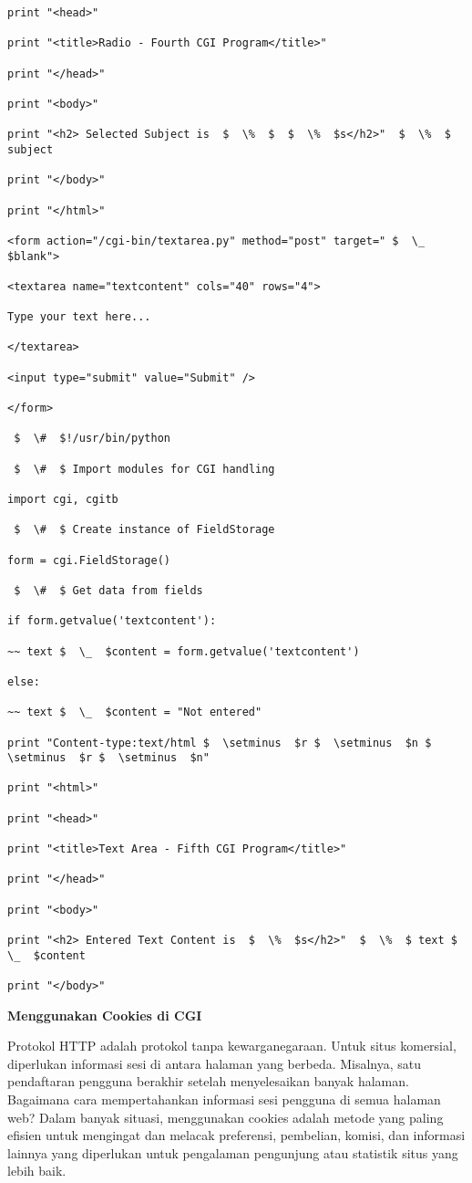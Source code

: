 \begin {enumerate}
\begin {enumerate}
\begin{verbatim}
print "<head>"

print "<title>Radio - Fourth CGI Program</title>"

print "</head>"

print "<body>"

print "<h2> Selected Subject is  $  \%  $  $  \%  $s</h2>"  $  \%  $ subject

print "</body>"

print "</html>"

<form action="/cgi-bin/textarea.py" method="post" target=" $  \_  $blank">

<textarea name="textcontent" cols="40" rows="4">

Type your text here...

</textarea>

<input type="submit" value="Submit" />

</form>

 $  \#  $!/usr/bin/python

 $  \#  $ Import modules for CGI handling

import cgi, cgitb

 $  \#  $ Create instance of FieldStorage

form = cgi.FieldStorage()

 $  \#  $ Get data from fields

if form.getvalue('textcontent'):

~~ text $  \_  $content = form.getvalue('textcontent')

else:

~~ text $  \_  $content = "Not entered"

print "Content-type:text/html $  \setminus  $r $  \setminus  $n $  \setminus  $r $  \setminus  $n"

print "<html>"

print "<head>"

print "<title>Text Area - Fifth CGI Program</title>"

print "</head>"

print "<body>"

print "<h2> Entered Text Content is  $  \%  $s</h2>"  $  \%  $ text $  \_  $content

print "</body>"

\end{verbatim}

{\fontsize{14pt}{14pt}\selectfont \textbf{Menggunakan Cookies di CGI} \\}

Protokol HTTP adalah protokol tanpa kewarganegaraan. Untuk situs komersial, diperlukan informasi sesi di antara halaman yang berbeda. Misalnya, satu pendaftaran pengguna berakhir setelah menyelesaikan banyak halaman. Bagaimana cara mempertahankan informasi sesi pengguna di semua halaman web? Dalam banyak situasi, menggunakan cookies adalah metode yang paling efisien untuk mengingat dan melacak preferensi, pembelian, komisi, dan informasi lainnya yang diperlukan untuk pengalaman pengunjung atau statistik situs yang lebih baik.


\end{enumerate}
\end{enumerate}
